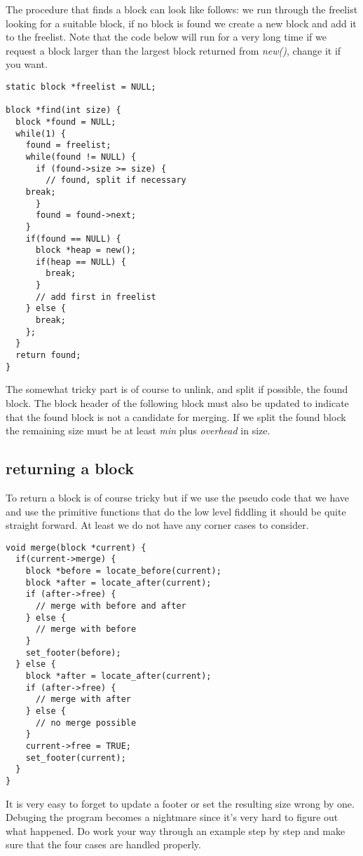 \documentclass[a4paper,11pt]{article}
\begin{document}
 The procedure that finds a block can look like follows: we run
 through the freelist looking for a suitable block, if no block is
 found we create a new block and add it to the freelist. Note that the
 code below will run for a very long time if we request a block larger
 than the largest block returned from {\em new()}, change it if you want.

 \begin{lstlisting}
static block *freelist = NULL;

block *find(int size) {
  block *found = NULL;
  while(1) {
    found = freelist;
    while(found != NULL) {
      if (found->size >= size) {
        // found, split if necessary
	break;
      }
      found = found->next;
    }
    if(found == NULL) {
      block *heap = new();
      if(heap == NULL) {
        break;
      } 
      // add first in freelist	
    } else {
      break;
    };
  }
  return found;
}
 \end{lstlisting}

 The somewhat tricky part is of course to unlink, and split if
 possible, the found block. The block header of the following block
 must also be updated to indicate that the found block is not a
 candidate for merging. If we split the found block the remaining size
 must be at least {\em min} plus {\em overhead} in size.
 
 \subsection{returning a block}

 To return a block is of course tricky but if we use the pseudo code
 that we have and use the primitive functions that do the low level
 fiddling it should be quite straight forward. At least we do not have
 any corner cases to consider.

 \begin{lstlisting}
void merge(block *current) {
  if(current->merge) {
    block *before = locate_before(current);
    block *after = locate_after(current);
    if (after->free) {
      // merge with before and after
    } else {
      // merge with before 
    }
    set_footer(before);
  } else {
    block *after = locate_after(current);
    if (after->free) {
      // merge with after
    } else {
      // no merge possible
    }
    current->free = TRUE;
    set_footer(current);    
  }
}
 \end{lstlisting}

 It is very easy to forget to update a footer or set the resulting
 size wrong by one. Debuging the program becomes a nightmare since
 it's very hard to figure out what happened. Do work your way through
 an example step by step and make sure that the four cases are handled
 properly. 
 
\end{document}
